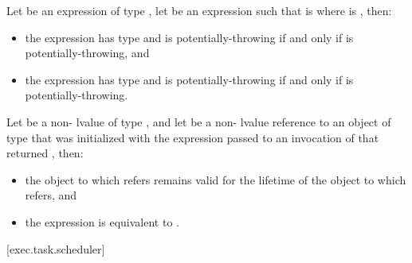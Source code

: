 \pnum
Let  be an expression of type ,
let  be an expression such that
 is 
where  is ,
then:
\begin{itemize}
\item the expression  has
type 
and is potentially-throwing if and only if
 is potentially-throwing, and
\item the expression
 has
type\brk{}  and is potentially-throwing
if and only if  is potentially-throwing.
\end{itemize}

\pnum
Let  be a non- lvalue of type
, and let  be
a non- lvalue reference to an object of type  that
was initialized with the expression  passed to an
invocation of  that returned , then:
\begin{itemize}
\item the object to which  refers remains valid for
the lifetime of the object to which  refers, and
\item the expression  is equivalent to
.
\end{itemize}

[exec.task.scheduler]{}


